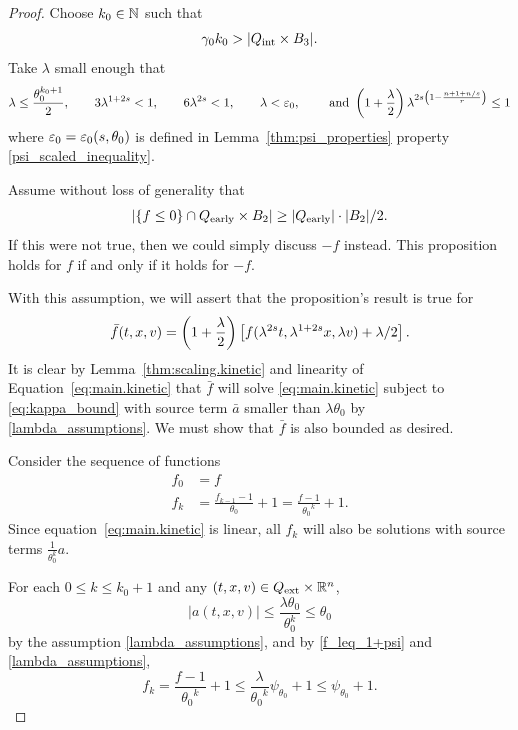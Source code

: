 \begin{proof}
Choose $k_0 \in \mathbb{N}$ such that
\[ \gamma_0 k_0 > |{Q_\textrm{int}} \times B_3|. \]
Take $\lambda$ small enough that
\begin{equation}\label{lambda_assumptions}
\lambda \leq \frac{\theta_0^{k_0+1}}{2}, \qquad 3\lambda^{1+2s} < 1, \qquad 6\lambda^{2s} < 1, \qquad \lambda < \varepsilon_0, \qquad \textrm{ and } \left( 1+\frac{\lambda}{2} \right)\lambda^{2s\left( 1 - \frac{n+1+n/s}{{r}} \right)} \leq 1
\end{equation}
where $\varepsilon_0 = \varepsilon_0(s,\theta_0)$ is defined in Lemma~\ref{thm:psi_properties} property \eqref{psi_scaled_inequality}.  

Assume without loss of generality that 
\begin{equation} \label{fk_can_haz_measure_below}
|\{f\leq 0\} \cap {Q_\textrm{early}} \times B_2| \geq |{Q_\textrm{early}}|\cdot |B_2|/2. 
\end{equation}  
If this were not true, then we could simply discuss $-f$ instead.  This proposition holds for $f$ if and only if it holds for $-f$.  

With this assumption, we will assert that the proposition's result is true for
\[ \bar{f}(t,x,v) = \left( 1+\frac{\lambda}{2} \right)\left[ f(\lambda^{2s} t, \lambda^{1+2s} x, \lambda v) + \lambda/2 \right]. \]
It is clear by Lemma~\ref{thm:scaling.kinetic} and linearity of Equation~\eqref{eq:main.kinetic} that $\bar{f}$ will solve \eqref{eq:main.kinetic} subject to \eqref{eq:kappa_bound} with source term $\bar{a}$ smaller than $\lambda \theta_0$ by \eqref{lambda_assumptions}.  We must show that $\bar{f}$ is also bounded as desired.  

Consider the sequence of functions
\begin{align*}
f_0 &= f \\
f_k &= \frac{f_{k-1}-1}{{\theta_0}} + 1 = \frac{f-1}{{\theta_0}^k} + 1.
\end{align*}
Since equation~\eqref{eq:main.kinetic} is linear, all $f_k$ will also be solutions with source terms $\frac{1}{\theta_0^k} a$.  

For each $0 \leq k \leq k_0+1$ and any $(t,x,v) \in {Q_\textrm{ext}}\times\mathbb{R}^n$, 
\[ |a(t,x,v)| \leq \frac{\lambda\theta_0}{\theta_0^k} \leq \theta_0 \]
by the assumption \eqref{lambda_assumptions}, and by \eqref{f_leq_1+psi} and \eqref{lambda_assumptions},
\begin{equation}\label{fk_has_bounded_growth} 
f_k = \frac{f-1}{{\theta_0}^k} + 1 \leq \frac{\lambda}{{\theta_0}^k} \psi_{\theta_0} + 1 \leq \psi_{\theta_0} + 1. 
\end{equation}


\end{proof}
